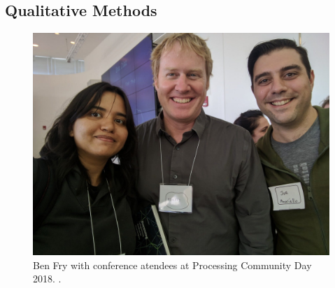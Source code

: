 






\subsection{Qualitative Methods}
\begin{figure}[H]
  \begin{minipage}{\textwidth}
    \includegraphics[width=\linewidth]{images/pcd2018.jpg}
    \caption[Ben Fry at PCD 2018]{Ben Fry with conference atendees at Processing Community Day 2018. .}
    \label{fig:benFry}
    
  \end{minipage}
\end{figure}

